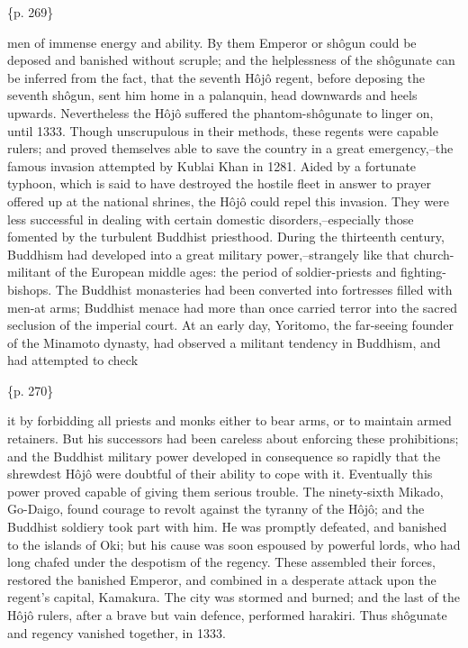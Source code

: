 \{p. 269\}

men of immense energy and ability. By them Emperor or shôgun could be deposed and banished without scruple; and the helplessness of the shôgunate can be inferred from the fact, that the seventh Hôjô regent, before deposing the seventh shôgun, sent him home in a palanquin, head downwards and heels upwards. Nevertheless the Hôjô suffered the phantom-shôgunate to linger on, until 1333. Though unscrupulous in their methods, these regents were capable rulers; and proved themselves able to save the country in a great emergency,--the famous invasion attempted by Kublai Khan in 1281. Aided by a fortunate typhoon, which is said to have destroyed the hostile fleet in answer to prayer offered up at the national shrines, the Hôjô could repel this invasion. They were less successful in dealing with certain domestic disorders,--especially those fomented by the turbulent Buddhist priesthood. During the thirteenth century, Buddhism had developed into a great military power,--strangely like that church-militant of the European middle ages: the period of soldier-priests and fighting-bishops. The Buddhist monasteries had been converted into fortresses filled with men-at arms; Buddhist menace had more than once carried terror into the sacred seclusion of the imperial court. At an early day, Yoritomo, the far-seeing founder of the Minamoto dynasty, had observed a militant tendency in Buddhism, and had attempted to check

\{p. 270\}

it by forbidding all priests and monks either to bear arms, or to maintain armed retainers. But his successors had been careless about enforcing these prohibitions; and the Buddhist military power developed in consequence so rapidly that the shrewdest Hôjô were doubtful of their ability to cope with it. Eventually this power proved capable of giving them serious trouble. The ninety-sixth Mikado, Go-Daigo, found courage to revolt against the tyranny of the Hôjô; and the Buddhist soldiery took part with him. He was promptly defeated, and banished to the islands of Oki; but his cause was soon espoused by powerful lords, who had long chafed under the despotism of the regency. These assembled their forces, restored the banished Emperor, and combined in a desperate attack upon the regent's capital, Kamakura. The city was stormed and burned; and the last of the Hôjô rulers, after a brave but vain defence, performed harakiri. Thus shôgunate and regency vanished together, in 1333.



